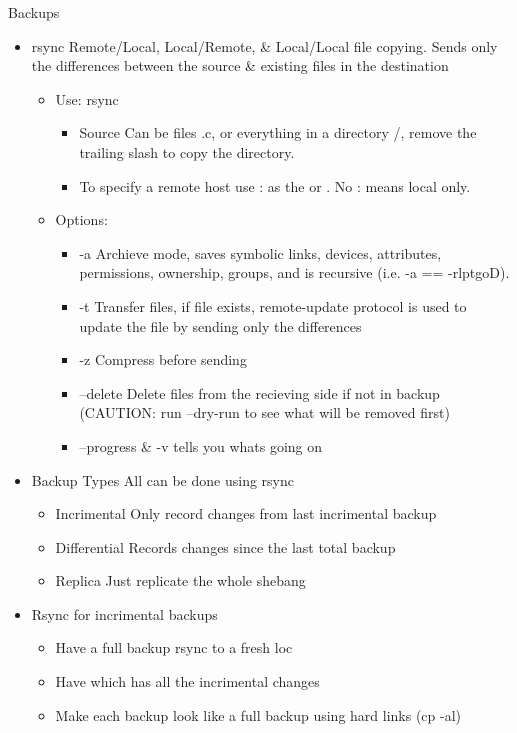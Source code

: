 \documentclass{notes}
\begin{document}
\begin{questions}{Backups}
	\begin{itemize}
		\item rsync \ra Remote/Local, Local/Remote, \& Local/Local file copying. Sends only the differences between the source \& existing files in the destination
			\begin{itemize}
				\item Use: rsync   
					\begin{itemize}
						\item Source \ra Can be files \ra *.c, or everything in a directory /, remove the trailing slash to copy the directory.
						\item To specify a remote host \opt{computer name} use \ra {}: as the  or . No : means local only.
					\end{itemize}
				\item Options:
					\begin{itemize}
						\item -a \ra Archieve mode, saves symbolic links, devices, attributes, permissions, ownership, groups, and is recursive (i.e. -a == -rlptgoD).
						\item -t \ra Transfer files, if file exists, remote-update protocol is used to update the file by sending only the differences
						\item -z \ra Compress before sending
						\item --delete \ra Delete files from the recieving side if not in backup (CAUTION: run --dry-run to see what will be removed first)
						\item --progress \& -v tells you whats going on
					\end{itemize}
			\end{itemize}
		\item Backup Types \ra All can be done using rsync
			\begin{itemize}
				\item Incrimental \ra Only record changes from last incrimental backup
				\item Differential \ra Records changes since the last total backup
				\item Replica \ra Just replicate the whole shebang
			\end{itemize}
		\item Rsync for incrimental backups
			\begin{itemize}
				\item Have a full backup  \ra rsync to a fresh loc
				\item Have  which has all the incrimental changes
				\item Make each backup look like a full backup using hard links (cp -al)
			\end{itemize}
	\end{itemize}
\end{questions}
\end{document}
